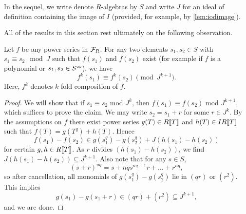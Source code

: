 \documentclass[../main.tex]{subfiles}
\begin{document}
In the sequel, we write denote $R$-algebras by $S$ and write $J$ for an ideal
of definition containing the image of $I$ (provided, for example, by \ref{lem:iodimage}). 

All of the results in this section rest ultimately on the following observation.
\begin{lem}\label{lem:cryscalc}
  Let $f$ be any power series in $\mathcal{F}_R$. For any two elements $s_1,s_2 \in S$ 
  with $s_1 \equiv s_2 \mod J$ such that $f(s_1)$ and $f(s_2)$ exist (for
  example if $f$ is a polynomial or $s_1, s_2 \in S^{\circ \hspace{-0.5pt} \circ}$), we have 
  \begin{equation*}
    f^k(s_1) \equiv f^k(s_2) \pmod {J^{k+1}}.
  \end{equation*}
  Here, $f^k$ denotes $k$-fold composition of $f$.
\begin{proof}
  We will show that if $s_1 \equiv s_2$ mod $J^k$, then $f(s_1) \equiv f(s_2)$ mod 
  $J^{k+1}$, which suffices to prove the claim. 
  We may write $s_2 = s_1 + r$ for some $r\in J^k$. By the assumptions on $f$
  there exist power series 
  $g(T) \in R\llbracket T \rrbracket$ and $h(T) \in IR\llbracket T \rrbracket$ such that 
  $f(T) = g(T^q) + h(T)$. Hence
  \begin{equation*}
    f(s_1) - f(s_2) \in g(s_1^{q})-g(s_2^{q}) + J( h(s_1) - h(s_2) )
  \end{equation*}
  for certain $g,h \in R\llbracket T \rrbracket$. As $r$ divides $\left(h(s_1) -
  h(s_2)\right)$, we find
  $J(h(s_1) - h(s_2)) \subseteq J^{k+1}$. Also note that 
  for any $s\in S$, $$(s+r)^{nq} = s + nqs^{nq-1}r + \dots + r^{nq},$$
  so after cancellation, all monomials of $g(s_1^q) - g(s_2^q)$ lie in
  $(qr)$ or $(r^2)$. This implies
  \begin{equation*}
    g(s_1) - g(s_1+r) \in (qr) + (r^2) \subseteq J^{k+1},
  \end{equation*}
  and we are done.
\end{proof}
\end{lem}
\end{document}
